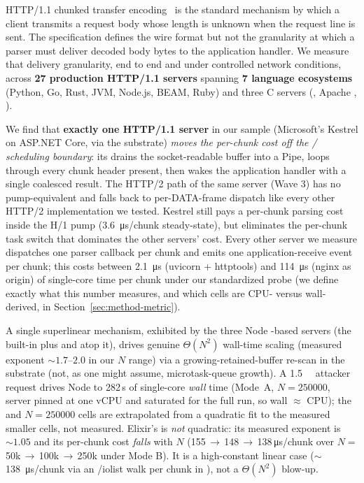 HTTP/1.1 chunked transfer encoding~\cite{rfc9112} is the standard
mechanism by which a client transmits a request body whose length is
unknown when the request line is sent. The specification defines the
wire format but not the granularity at which a parser must deliver
decoded body bytes to the application handler. We measure that
delivery granularity, end to end and under controlled network
conditions, across \textbf{27 production HTTP/1.1 servers} spanning
\textbf{7 language ecosystems} (Python, Go, Rust, JVM, Node.js,
BEAM, Ruby) and three C servers (, Apache ,
).

We find that \textbf{exactly one HTTP/1.1 server} in our sample
(Microsoft's Kestrel on ASP.NET Core, via the
 substrate)
\emph{moves the per-chunk cost off the
/ scheduling boundary}: its
 drains the
socket-readable buffer into a Pipe, loops through every chunk
header present, then wakes the application handler with a single
coalesced  result. The HTTP/2 path of
the same server (Wave 3) has no pump-equivalent and falls back to
per-DATA-frame dispatch like every other HTTP/2 implementation
we tested. Kestrel still pays a per-chunk parsing cost inside the
H/1 pump (\SI{3.6}{\micro\second}/chunk steady-state), but
eliminates the per-chunk task switch that dominates the other
servers' cost.
Every other server we measure dispatches one parser callback per
chunk and emits one application-receive event per chunk; this
costs between \SI{2.1}{\micro\second} (uvicorn + httptools) and
\SI{114}{\micro\second} (nginx as origin) of single-core time per
chunk under our standardized probe (we define exactly what this
number measures, and which cells are CPU- versus wall-derived, in
Section~\ref{sec:method-metric}).

A single superlinear mechanism, exhibited by the three
Node -based servers (the built-in
 plus  and  atop
it), drives genuine $\Theta(N^2)$ wall-time scaling (measured
exponent $\sim 1.7$--$2.0$ in our $N$ range) via a
growing-retained-buffer re-scan in the  substrate
(not, as one might assume, microtask-queue growth). A
\SI{1.5}{\mebi\byte} attacker request drives Node
 to 282\,s of single-core \emph{wall} time
(Mode~A, $N{=}\num{250000}$, server pinned at one vCPU and
saturated for the full run, so wall $\approx$ CPU); the
 and  $N{=}\num{250000}$ cells are
extrapolated from a quadratic fit to the measured smaller cells,
not measured. Elixir's  is \emph{not} quadratic: its
measured exponent is $\sim 1.05$ and its per-chunk cost
\emph{falls} with $N$
(155\,$\to$\,148\,$\to$\,138\,\si{\micro\second}/chunk over
$N{=}$50k\,$\to$\,100k\,$\to$\,250k under Mode B). It is a
high-constant linear case ($\sim$\SI{138}{\micro\second}/chunk via
an /iolist walk per chunk in
), not a $\Theta(N^2)$ blow-up.

